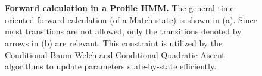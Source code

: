 \documentclass[preprint,12pt,authoryear]{elsarticle}
\begin{document}
\begin{figure}[htp]
\centering
{} \\
 \\
 \caption{\textbf{Forward calculation in a Profile HMM.}  The general time-oriented forward calculation (of a Match state) is shown in (a).  Since most transitions are not allowed, only the transitions denoted by arrows in (b) are relevant.  This constraint is utilized by the Conditional Baum-Welch and Conditional Quadratic Ascent algorithms to update parameters state-by-state efficiently.}
  \label{cbw_fig:Plan7ForwardInTimeandByState_Match}
\end{figure}
\end{document}
